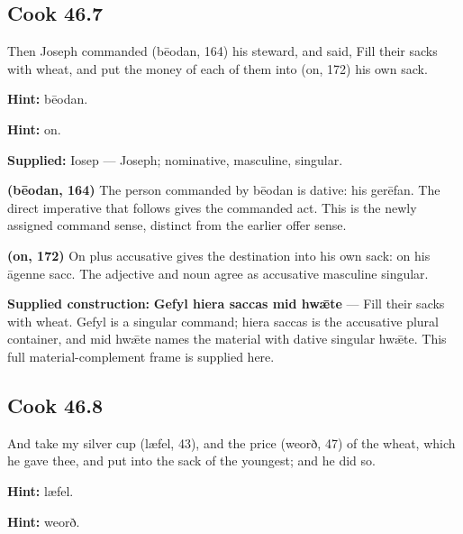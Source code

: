 \par\begin{minipage}{\linewidth}\raggedright
\subsection*{Cook 46.7}

Then Joseph commanded (bēodan, 164) his steward, and said, Fill their sacks with wheat, and put the money of each of them into (on, 172) his own sack.

\textbf{Hint:} bēodan.

\textbf{Hint:} on.

\textbf{Supplied:} Iosep — Joseph; nominative, masculine, singular.

\textbf{(bēodan, 164)} The person commanded by bēodan is dative: his gerēfan. The direct imperative that follows gives the commanded act. This is the newly assigned command sense, distinct from the earlier offer sense.

\textbf{(on, 172)} On plus accusative gives the destination into his own sack: on his āgenne sacc. The adjective and noun agree as accusative masculine singular.

\end{minipage}\par\addvspace{4pt}

\textbf{Supplied construction:} \textbf{Gefyl hiera saccas mid hwǣte} — Fill their sacks with wheat. Gefyl is a singular command; hiera saccas is the accusative plural container, and mid hwǣte names the material with dative singular hwǣte. This full material-complement frame is supplied here.

\par\begin{minipage}{\linewidth}\raggedright
\subsection*{Cook 46.8}

And take my silver cup (læfel, 43), and the price (weorð, 47) of the wheat, which he gave thee, and put into the sack of the youngest; and he did so.

\textbf{Hint:} læfel.

\textbf{Hint:} weorð.

\end{minipage}\par\addvspace{4pt}

